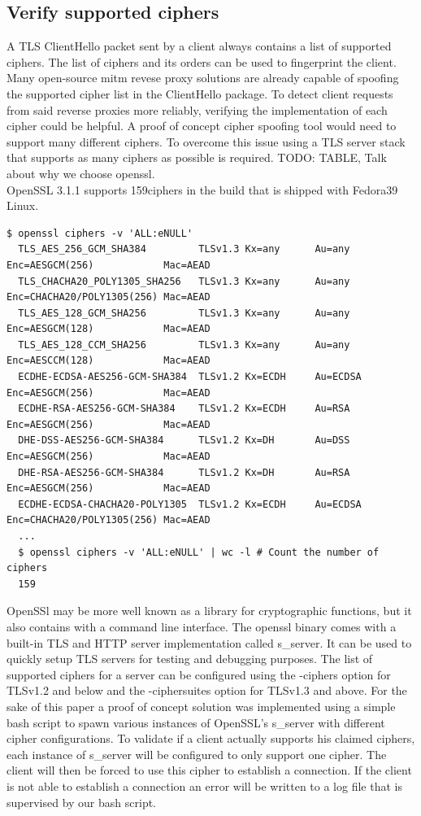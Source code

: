 \documentclass[12pt]{scrbook}
\begin{document}
\newpage \subsection{Verify supported ciphers} A TLS ClientHello packet sent
by a client always contains a list of supported ciphers. The list of ciphers
and its orders can be used to fingerprint the client. Many open-source mitm
revese proxy solutions are already capable of spoofing the supported cipher
list in the ClientHello package. To detect client requests from said reverse
proxies more reliably, verifying the implementation of each cipher could be
helpful. A proof of concept cipher spoofing tool would need to support many
different ciphers. To overcome this issue using a TLS server stack that
supports as many ciphers as possible is required. TODO: TABLE, Talk about why
we choose openssl.\\OpenSSL 3.1.1 supports 159ciphers in the build that is
shipped with Fedora39 Linux.

\begin{lstlisting}[breaklines=true,basicstyle=\tiny]
  $ openssl ciphers -v 'ALL:eNULL'
  TLS_AES_256_GCM_SHA384         TLSv1.3 Kx=any      Au=any   Enc=AESGCM(256)            Mac=AEAD
  TLS_CHACHA20_POLY1305_SHA256   TLSv1.3 Kx=any      Au=any   Enc=CHACHA20/POLY1305(256) Mac=AEAD
  TLS_AES_128_GCM_SHA256         TLSv1.3 Kx=any      Au=any   Enc=AESGCM(128)            Mac=AEAD
  TLS_AES_128_CCM_SHA256         TLSv1.3 Kx=any      Au=any   Enc=AESCCM(128)            Mac=AEAD
  ECDHE-ECDSA-AES256-GCM-SHA384  TLSv1.2 Kx=ECDH     Au=ECDSA Enc=AESGCM(256)            Mac=AEAD
  ECDHE-RSA-AES256-GCM-SHA384    TLSv1.2 Kx=ECDH     Au=RSA   Enc=AESGCM(256)            Mac=AEAD
  DHE-DSS-AES256-GCM-SHA384      TLSv1.2 Kx=DH       Au=DSS   Enc=AESGCM(256)            Mac=AEAD
  DHE-RSA-AES256-GCM-SHA384      TLSv1.2 Kx=DH       Au=RSA   Enc=AESGCM(256)            Mac=AEAD
  ECDHE-ECDSA-CHACHA20-POLY1305  TLSv1.2 Kx=ECDH     Au=ECDSA Enc=CHACHA20/POLY1305(256) Mac=AEAD
  ...
  $ openssl ciphers -v 'ALL:eNULL' | wc -l # Count the number of ciphers
  159
\end{lstlisting}

OpenSSl may be more well known as a library for cryptographic functions, but it
also contains with a command line interface. The openssl binary comes with a
built-in TLS and HTTP server implementation called s\_server. It can be used to
quickly setup TLS servers for testing and debugging purposes. The list of
supported ciphers for a server can be configured using the -ciphers option for
TLSv1.2 and below and the -ciphersuites option for TLSv1.3 and above. For the
sake of this paper a proof of concept solution was implemented using a simple
bash script to spawn various instances of OpenSSL's s\_server with different
cipher configurations. To validate if a client actually supports his claimed
ciphers, each instance of s\_server will be configured to only support one
cipher. The client will then be forced to use this cipher to establish a
connection. If the client is not able to establish a connection an error will be
written to a log file that is supervised by our bash script.
\end{document}
